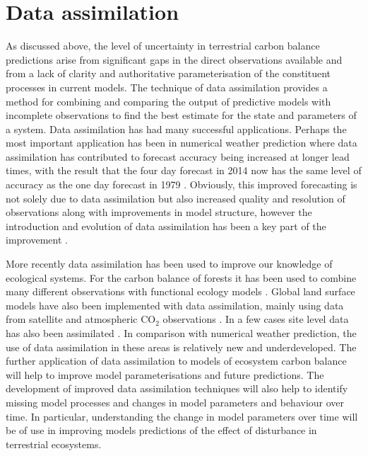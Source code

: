\documentclass[12pt]{article}
\begin{document}
\section{Data assimilation}


As discussed above, the level of uncertainty in terrestrial carbon balance predictions arise from significant gaps in the direct observations available and from a lack of clarity and authoritative parameterisation of the constituent processes in current models. The technique of data assimilation provides a method for combining and comparing the output of predictive models with incomplete observations to find the best estimate for the state and parameters of a system. Data assimilation has had many successful applications. Perhaps the most important application has been in numerical weather prediction where data assimilation has contributed to forecast accuracy being increased at longer lead times, with the result that the four day forecast in 2014 now has the same level of accuracy as the one day forecast in 1979 \citep{bauer2015quiet}. Obviously, this improved forecasting is not solely due to data assimilation but also increased quality and resolution of observations along with improvements in model structure, however the introduction and evolution of data assimilation has been a key part of the improvement \citep{dee2011era}.

More recently data assimilation has been used to improve our knowledge of ecological systems. For the carbon balance of forests it has been used to combine many different observations with functional ecology models \citep{zobitz2011primer, fox2009reflex, richardson2010estimating, Quaife2008, Zobitz2014, Niu2014}. Global land surface models have also been implemented with data assimilation, mainly using data from satellite and atmospheric $\text{CO}_{2}$ observations \citep{Kaminski2013, scholze2007propagating}. In a few cases site level data has also been assimilated \citep{Verbeeck2011, Bacour2015}. In comparison with numerical weather prediction, the use of data assimilation in these areas is relatively new and underdeveloped. The further application of data assimilation to models of ecosystem carbon balance will help to improve model parameterisations and future predictions. The development of improved data assimilation techniques will also help to  identify missing model processes and changes in model parameters and behaviour over time. In particular, understanding the change in model parameters over time will be of use in improving models predictions of the effect of disturbance in terrestrial ecosystems.
  


{}
\end{document}
